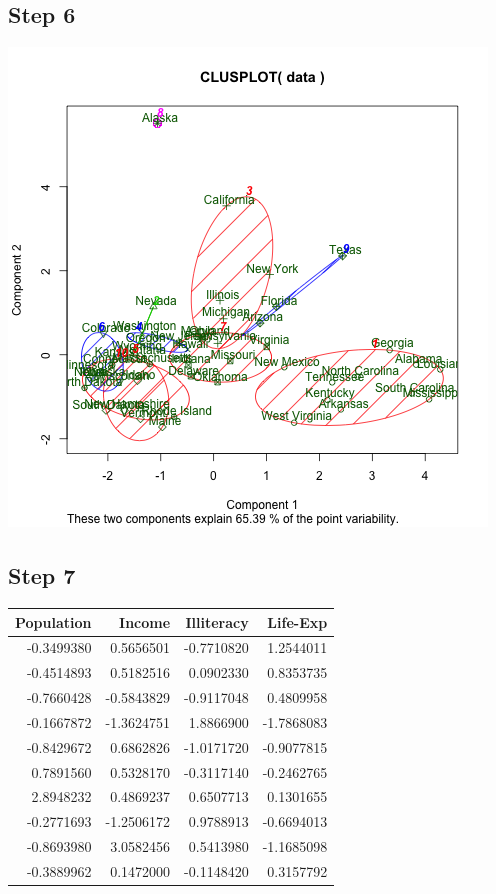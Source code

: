 \documentclass[11pt]{article}
\begin{document}
\subsection*{Step 6}
\label{sec:orgc351224}
\begin{center}
\includegraphics[width=.9\linewidth]{kmeans-10.png}
\end{center}
\subsection*{Step 7}
\label{sec:orgf0e2259}

\begin{center}
\begin{tabular}{rrrr}
Population & Income & Illiteracy & Life-Exp\\
\hline
-0.3499380 & 0.5656501 & -0.7710820 & 1.2544011\\
-0.4514893 & 0.5182516 & 0.0902330 & 0.8353735\\
-0.7660428 & -0.5843829 & -0.9117048 & 0.4809958\\
-0.1667872 & -1.3624751 & 1.8866900 & -1.7868083\\
-0.8429672 & 0.6862826 & -1.0171720 & -0.9077815\\
0.7891560 & 0.5328170 & -0.3117140 & -0.2462765\\
2.8948232 & 0.4869237 & 0.6507713 & 0.1301655\\
-0.2771693 & -1.2506172 & 0.9788913 & -0.6694013\\
-0.8693980 & 3.0582456 & 0.5413980 & -1.1685098\\
-0.3889962 & 0.1472000 & -0.1148420 & 0.3157792\\
\end{tabular}
\end{center}
\end{document}
